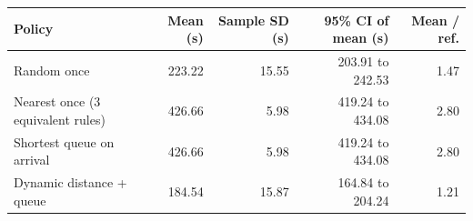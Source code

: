 \begin{tabular}{lrrrr}
\toprule
Policy & Mean (s) & Sample SD (s) & 95\% CI of mean (s) & Mean / ref. \\
\midrule
Random once & 223.22 & 15.55 & 203.91 to 242.53 & 1.47 \\
Nearest once (3 equivalent rules) & 426.66 & 5.98 & 419.24 to 434.08 & 2.80 \\
Shortest queue on arrival & 426.66 & 5.98 & 419.24 to 434.08 & 2.80 \\
Dynamic distance + queue & 184.54 & 15.87 & 164.84 to 204.24 & 1.21 \\
\bottomrule
\end{tabular}
